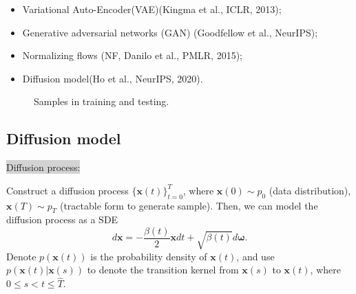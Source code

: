 \documentclass[mathserif,envcountsect,compress,8pt]{beamer}
\begin{document}
\begin{frame}
	\setlength{\parskip}{0.6\baselineskip}
	
	\begin{itemize}
		\item [\ding{226}] Variational Auto-Encoder(VAE)(Kingma et al., ICLR, 2013);
		\item [\ding{226}] Generative adversarial networks (GAN) (Goodfellow et al., NeurIPS);
		\item [\ding{226}] Normalizing flows (NF, Danilo et al., PMLR, 2015);
		\item [\ding{226}] Diffusion model(Ho et al., NeurIPS, 2020).
	\end{itemize}
	
	\begin{figure}[H]
		\centering
		\centering
		\caption{Samples in training and testing.}\label{fig_1}
	\end{figure}
	
	
	
\end{frame}
\subsection{Diffusion model}
\begin{frame}
	\setlength{\parskip}{0.6\baselineskip}
	\colorbox {lightgray}{{\color{blue}Diffusion process:}}\\
	\vspace{20pt}
	
	Construct a diffusion process $\{\mathbf{x}(t)\}_{t=0}^{T}$, where $\mathbf{x}(0)\sim p_0$ (data distribution), $\mathbf{x}(T)\sim p_{T}$ (tractable form to generate sample).
	Then, we can model the diffusion process as a SDE
	\begin{equation}\label{2.2s}
		d\mathbf{x}=-\frac{\beta(t)}{2}\mathbf{x}dt+\sqrt{\beta(t)}d\mathbf{\omega}.
	\end{equation}
	Denote $p(\mathbf{x}(t))$ is the probability density of $\mathbf{x}(t)$, and use $p(\mathbf{x}(t)|\mathbf{x}(s))$
	to denote the transition kernel from $\mathbf{x}(s)$ to $\mathbf{x}(t)$,  where $0\le s<t\le \hat{T} $.
\end{frame}
\end{document}
